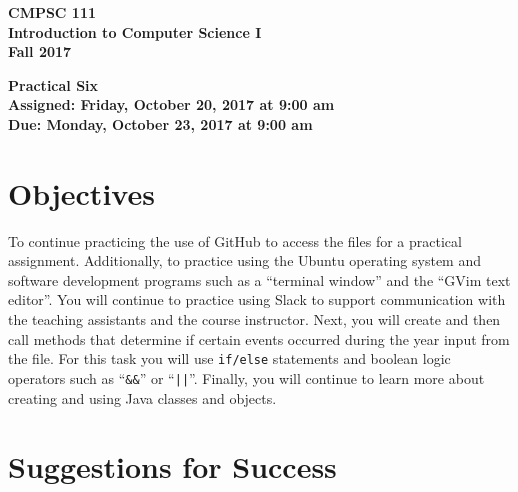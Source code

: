 \documentclass[11pt]{article}
\newcommand{\assignmentduedate}{October 23}
\newcommand{\assignmentassignedate}{October 20}
\newcommand{\assignmentnumber}{Six}
\newcommand{\labyear}{2017}
\newcommand{\labdueday}{Monday}
\newcommand{\labassignday}{Friday}
\newcommand{\labtime}{9:00 am}
\newcommand{\assigneddate}{Assigned: \labassignday, \assignmentassignedate, \labyear{} at \labtime{}}
\newcommand{\duedate}{Due: \labdueday, \assignmentduedate, \labyear{} at \labtime{}}
\newcommand{\labtitle}[1]
{
  \begin{center}
    \begin{center}
      \bf
      CMPSC 111\\Introduction to Computer Science I\\
      Fall 2017\\
      \medskip
    \end{center}
    \bf
    #1
  \end{center}
}
\begin{document}
\thispagestyle{empty}

\labtitle{Practical \assignmentnumber{} \\ \assigneddate{} \\ \duedate{}}

\section*{Objectives}

To continue practicing the use of GitHub to access the files for a practical assignment. Additionally, to practice using
the Ubuntu operating system and software development programs such as a ``terminal window'' and the ``GVim text
editor''. You will continue to practice using Slack to support communication with the teaching assistants and the course
instructor. Next, you will create and then call methods that determine if certain events occurred during the year input
from the file. For this task you will use {\tt if/else} statements and boolean logic operators such as ``{\tt \&\&}'' or
``{\tt ||}''. Finally, you will continue to learn more about creating and using Java classes and objects.

\section*{Suggestions for Success}
\end{document}
